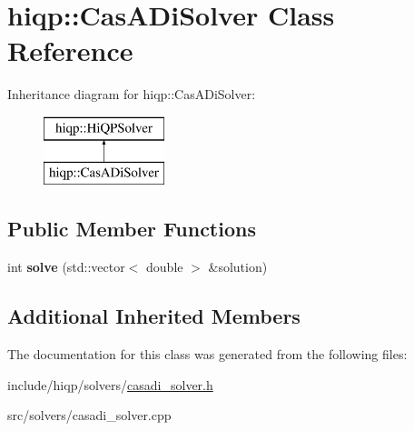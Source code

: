 \hypertarget{classhiqp_1_1CasADiSolver}{\section{hiqp\-:\-:Cas\-A\-Di\-Solver Class Reference}
\label{classhiqp_1_1CasADiSolver}
}
Inheritance diagram for hiqp\-:\-:Cas\-A\-Di\-Solver\-:\begin{figure}[H]
\begin{center}
\leavevmode
\includegraphics[height=2.000000cm]{classhiqp_1_1CasADiSolver}
\end{center}
\end{figure}
\subsection*{Public Member Functions}
\begin{DoxyCompactItemize}
\item 
\hypertarget{classhiqp_1_1CasADiSolver_a30fdfd2289613a3d38fd44a7db266134}{int {\bfseries solve} (std\-::vector$<$ double $>$ \&solution)}\label{classhiqp_1_1CasADiSolver_a30fdfd2289613a3d38fd44a7db266134}

\end{DoxyCompactItemize}
\subsection*{Additional Inherited Members}


The documentation for this class was generated from the following files\-:\begin{DoxyCompactItemize}
\item 
include/hiqp/solvers/\hyperlink{casadi__solver_8h}{casadi\-\_\-solver.\-h}\item 
src/solvers/casadi\-\_\-solver.\-cpp\end{DoxyCompactItemize}
